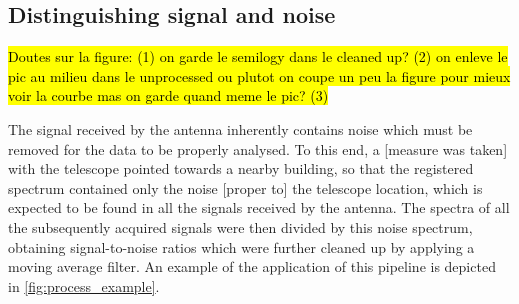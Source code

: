 \subsection{Distinguishing signal and noise}
\hl{Doutes sur la figure: (1) on garde le semilogy dans le cleaned up? (2) on enleve le pic au milieu dans le unprocessed ou plutot on coupe un peu la figure pour mieux voir la courbe mas on garde quand meme le pic? (3)}

The signal received by the antenna inherently contains noise which must be removed for the data to be properly analysed.
To this end, a [measure was taken] with the telescope pointed towards a nearby building, so that the registered spectrum  contained only the noise [proper to] the telescope location, which is expected to be found in all the signals received by the antenna.
The spectra of all the subsequently acquired signals were then divided by this noise spectrum, obtaining  signal-to-noise ratios which were further cleaned up by applying a moving average filter.
An example of the application of this pipeline is depicted in \autoref{fig:process_example}.
